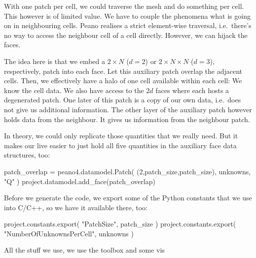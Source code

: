 With one patch per cell, we could traverse the mesh and do something per cell.
This however is of limited value.
We have to couple the phenomena what is going on in neighbouring cells.
Peano realises a strict element-wise traversal, i.e.~there's no way to access
the neighbour cell of a cell directly.
However, we can hijack the faces.


The idea here is that we embed a $2 \times N$ ($d=2$) or $2 \times N \times N$
($d=3$), respectively, patch into each face. 
Let this auxiliary patch overlap the adjacent cells.
Then, we effectively have a halo of one cell available within each cell:
We know the cell data. 
We also have access to the $2d$ faces where each hosts a degenerated patch.
One later of this patch is a copy of our own data, i.e.~does not give us
additional information.
The other layer of the auxiliary patch however holds data from the neighbour.
It gives us information from the neighbour patch.


In theory, we could only replicate those quantities that we really need. 
But it makes our live easier to just hold all five quantities in the auxiliary
face data structures, too:

\begin{code}
patch_overlap = peano4.datamodel.Patch( (2,patch_size,patch_size), unknowns, "Q" )
project.datamodel.add_face(patch_overlap)
\end{code}


Before we generate the code, we export some of the Python constants that we use
into C/C++, so we have it available there, too:

\begin{code}
project.constants.export( "PatchSize", patch_size )
project.constants.export( "NumberOfUnknownsPerCell", unknowns )
\end{code}


All the stuff we use, we use the toolbox and some vis

% 
